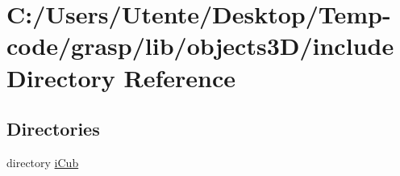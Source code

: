 \section{C\+:/\+Users/\+Utente/\+Desktop/\+Temp-\/code/grasp/lib/objects3\+D/include Directory Reference}
\label{dir_2adc2e87b1e3c2226b4cb908843f1b50}
\subsection*{Directories}
\begin{DoxyCompactItemize}
\item 
directory \hyperlink{dir_69b4abfc6cbb1560b0cc12f65f792213}{i\+Cub}
\end{DoxyCompactItemize}
